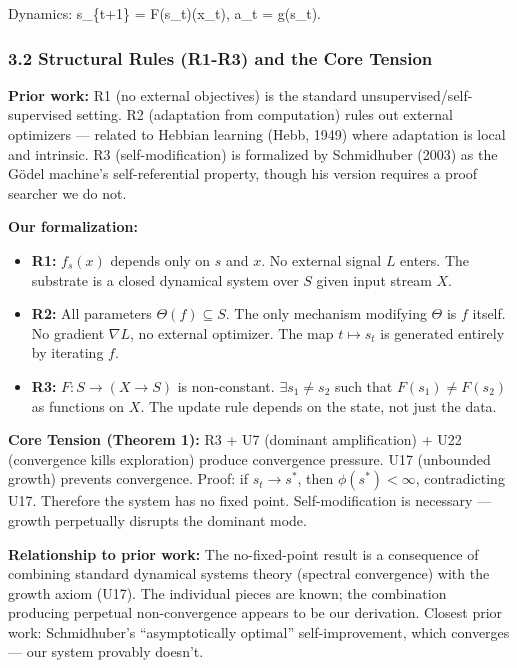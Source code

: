 \documentclass[
  11pt,
]{article}
\providecommand{\tightlist}{%
  \setlength{\itemsep}{0pt}\setlength{\parskip}{0pt}}
\begin{document}
Dynamics: s\_\{t+1\} = F(s\_t)(x\_t), a\_t = g(s\_t).

\subsubsection{3.2 Structural Rules (R1-R3) and the Core
Tension}\label{structural-rules-r1-r3-and-the-core-tension}

\textbf{Prior work:} R1 (no external objectives) is the standard
unsupervised/self-supervised setting. R2 (adaptation from computation)
rules out external optimizers --- related to Hebbian learning (Hebb,
1949) where adaptation is local and intrinsic. R3 (self-modification) is
formalized by Schmidhuber (2003) as the Gödel machine's self-referential
property, though his version requires a proof searcher we do not.

\textbf{Our formalization:}

\begin{itemize}
\tightlist
\item
  \textbf{R1:} \(f_s(x)\) depends only on \(s\) and \(x\). No external
  signal \(L\) enters. The substrate is a closed dynamical system over
  \(S\) given input stream \(X\).
\item
  \textbf{R2:} All parameters \(\Theta(f) \subseteq S\). The only
  mechanism modifying \(\Theta\) is \(f\) itself. No gradient
  \(\nabla L\), no external optimizer. The map \(t \mapsto s_t\) is
  generated entirely by iterating \(f\).
\item
  \textbf{R3:} \(F: S \to (X \to S)\) is non-constant.
  \(\exists s_1 \neq s_2\) such that \(F(s_1) \neq F(s_2)\) as functions
  on \(X\). The update rule depends on the state, not just the data.
\end{itemize}

\textbf{Core Tension (Theorem 1):} R3 + U7 (dominant amplification) +
U22 (convergence kills exploration) produce convergence pressure. U17
(unbounded growth) prevents convergence. Proof: if \(s_t \to s^*\), then
\(\phi(s^*) < \infty\), contradicting U17. Therefore the system has no
fixed point. Self-modification is necessary --- growth perpetually
disrupts the dominant mode.

\textbf{Relationship to prior work:} The no-fixed-point result is a
consequence of combining standard dynamical systems theory (spectral
convergence) with the growth axiom (U17). The individual pieces are
known; the combination producing perpetual non-convergence appears to be
our derivation. Closest prior work: Schmidhuber's ``asymptotically
optimal'' self-improvement, which converges --- our system provably
doesn't.
\end{document}
